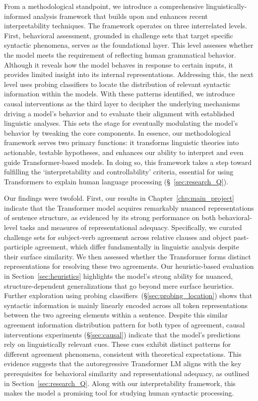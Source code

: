From a methodological standpoint, we introduce a comprehensive linguistically-informed analysis framework that builds upon and enhances recent interpretability techniques. The framework operates on three interrelated levels. First, behavioral assessment, grounded in challenge sets that target specific syntactic phenomena, serves as the foundational layer. This level assesses whether the model meets the requirement of reflecting human grammatical behavior. Although it reveals how the model behaves in response to certain inputs, it provides limited insight into its internal representations. Addressing this, the next level uses probing classifiers to locate the distribution of relevant syntactic information within the models. With these patterns identified, we introduce causal interventions as the third layer to decipher the underlying mechanisms driving a model's behavior and to evaluate their alignment with established linguistic analyses. This sets the stage for eventually modulating the model's behavior by tweaking the core components. In essence, our methodological framework serves two primary functions: it transforms linguistic theories into actionable, testable hypotheses, and enhances our ability to interpret and even guide Transformer-based models. In doing so, this framework takes a step toward fulfilling the `interpretability and controllability' criteria, essential for using Transformers to explain human language processing (\S~\ref{sec:research_Q}).


Our findings were twofold. First, our results in Chapter~\ref{chp:main_project} indicate that the Transformer model acquires remarkably nuanced representations of sentence structure, as evidenced by its strong performance on both behavioral-level tasks and measures of representational adequacy. Specifically, we curated challenge sets for subject-verb agreement across relative clauses and object past-participle agreement, which differ fundamentally in linguistic analysis despite their surface similarity. We then assessed whether the Transformer forms distinct representations for resolving these two agreements. Our heuristic-based evaluation in Section~\ref{sec:heuristics} highlights the model's strong ability for nuanced, structure-dependent generalizations that go beyond mere surface heuristics. Further exploration using probing classifiers~(\S\ref{sec:probing_location}) shows that syntactic information is mainly linearly encoded across all token representations between the two agreeing elements within a sentence. Despite this similar agreement information distribution pattern for both types of agreement, causal interventions experiments (\S\ref{sec:causal}) indicate that the model's predictions rely on linguistically relevant cues. These cues exhibit distinct patterns for different agreement phenomena, consistent with theoretical expectations. This evidence suggests that the autoregressive Transformer LM aligns with the key prerequisites for behavioral similarity and representational adequacy, as outlined in Section~\ref{sec:research_Q}. Along with our interpretability framework, this makes the model a promising tool for studying human syntactic processing.


